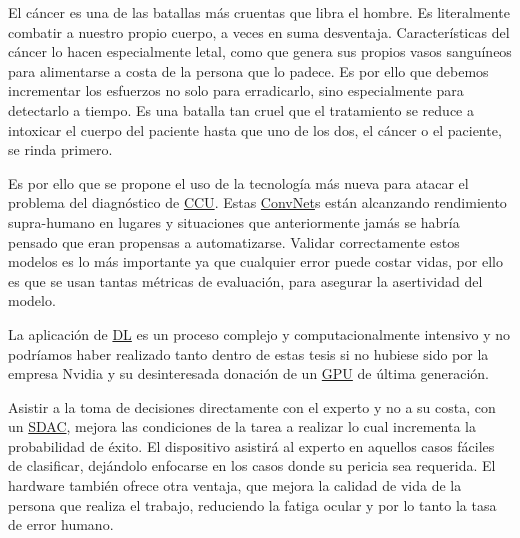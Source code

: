 El cáncer es una de las batallas más cruentas que libra el hombre. Es
literalmente combatir a nuestro propio cuerpo, a veces en suma desventaja.
Características del cáncer lo hacen especialmente letal, como que genera sus
propios vasos sanguíneos para alimentarse a costa de la persona que lo padece.
Es por ello que debemos incrementar los esfuerzos no solo para erradicarlo, sino
especialmente para detectarlo a tiempo. Es una batalla tan cruel que el
tratamiento se reduce a intoxicar el cuerpo del paciente hasta que uno de los
dos, el cáncer o el paciente, se rinda primero.

Es por ello que se propone el uso de la tecnología más nueva para atacar el
problema del diagnóstico de \hyperlink{abbr}{CCU}. Estas \hyperlink{abbr}{ConvNet}s están alcanzando rendimiento
supra-humano en lugares y situaciones que anteriormente jamás se habría pensado
que eran propensas a automatizarse. Validar correctamente estos modelos es lo
más importante ya que cualquier error puede costar vidas, por ello es que se
usan tantas métricas de evaluación, para asegurar la asertividad del modelo.

La aplicación de \hyperlink{abbr}{DL} es un proceso complejo y computacionalmente intensivo y no
podríamos haber realizado tanto dentro de estas tesis si no hubiese sido por la
empresa Nvidia y su desinteresada donación de un \hyperlink{abbr}{GPU} de última generación.

Asistir a la toma de decisiones directamente con el experto y no a su costa, con
un \hyperlink{abbr}{SDAC}, mejora las condiciones de la tarea a realizar lo cual
incrementa la probabilidad de éxito. El dispositivo asistirá al experto en
aquellos casos fáciles de clasificar, dejándolo enfocarse en los casos donde su
pericia sea requerida. El hardware también ofrece otra ventaja, que mejora la
calidad de vida de la persona que realiza el trabajo, reduciendo la fatiga
ocular y por lo tanto la tasa de error humano.


